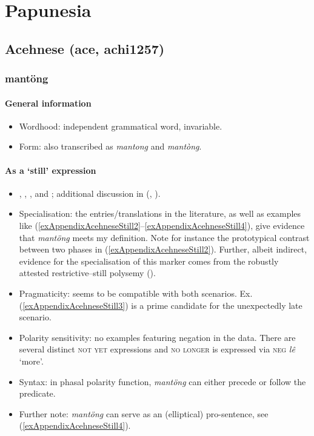 \chapter{Papunesia}
\label{appendixPapunesia}

\section{Acehnese (ace, achi1257)}\label{appendixAcehnese}
\subsection{mantöng}
\subsubsection{General information}
\begin{itemize}
	\item Wordhood: independent grammatical word, invariable.
	\item Form: also transcribed as \textit{mantong} and \textit{mantòng}.
\end{itemize}

\subsubsection{As a \lq{}still\rq{ }expression}
\label{appendixAcehneseStill}
\begin{itemize}
	\item  \textcite[112, 150]{DaudDurie1985}, \textcite[30]{DjajadiningratVol2}, \textcite[224]{Durie1985}, and \textcite[175]{Kreemer1931}; additional discussion in \citeauthor{vanBaar1991} (\citeyear{vanBaar1991}, \citeyear[110–111]{vanBaar1997}).
	\item Specialisation: the entries/translations in 
the literature, as well as examples like (\ref{exAppendixAcehneseStill2}–\ref{exAppendixAcehneseStill4}), give evidence that \textit{mantöng} meets my definition. Note for instance the prototypical contrast between two phases in (\ref{exAppendixAcehneseStill2}). Further, albeit indirect, evidence for the specialisation of this marker comes from the robustly attested restrictive–still polysemy (). 
	 \item Pragmaticity: seems to be compatible with both scenarios. Ex. (\ref{exAppendixAcehneseStill3}) is a prime candidate for the unexpectedly late scenario.
	\item Polarity sensitivity: no examples featuring negation in the data. There are several distinct \textsc{not yet} expressions and \textsc{no longer} is expressed via \textsc{neg} \textit{lê} \lq more'.
	\item Syntax: in phasal polarity function, \textit{mantöng} can either precede or follow the predicate.
	\item Further note: \textit{mantöng} can serve as an (elliptical) pro-sentence, see (\ref{exAppendixAcehneseStill4}).
\end{itemize}

